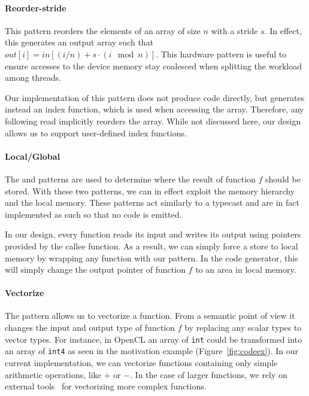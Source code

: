 \paragraph{Reorder-stride}
This pattern reorders the elements of an array of size $n$ with a stride $s$.
In effect, this generates an output array such that $ out[i] = in[(i / n) + s \cdot (i \mod n)] $.
This hardware pattern is useful to ensure accesses to the device memory stay coalesced when splitting the workload among threads.

Our implementation of this pattern does not produce code directly, but generates instead an index function, which is used when accessing the array.
Therefore, any following read implicitly reorders the array.
While not discussed here, our design allows us to support user-defined index functions.

\paragraph{Local/Global}
The  and  patterns are used to determine where the result of function $f$ should be stored.
With these two patterns, we can in effect exploit the memory hierarchy and the local memory.
These patterns act similarly to a typecast and are in fact implemented as such so that no code is emitted.

In our design, every function reads its input and writes its output using pointers provided by the callee function.
As a result, we can simply force a store to local memory by wrapping any function with our  pattern.
In the code generator, this will simply change the output pointer of function $f$ to an area in local memory.

\paragraph{Vectorize}
The  pattern allows us to vectorize a function.
From a semantic point of view it changes the input and output type of function $f$ by replacing any scalar types to vector types.
For instance, in OpenCL an array of \texttt{int} could be transformed into an array of \texttt{int4} as seen in the motivation example (Figure~\ref{fig:codeex}).
In our current implementation, we can vectorize functions containing only simple arithmetic operations, like $+$ or $-$.
In the case of larger functions, we rely on external tools~\cite{garrenberg11vect} for vectorizing more complex functions.


